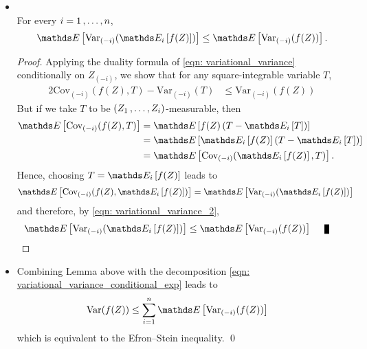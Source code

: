 \documentclass[11pt]{article}
\begin{document}
\begin{itemize}
\item \begin{lemma} \citep{boucheron2013concentration}\\
For every $i = 1 \,{,}\ldots{,}\, n$,
\begin{align*}
\E{}{\text{Var}_{(-i)}(\E{i}{f(Z)})} \le \E{}{\text{Var}_{(-i)}(f(Z))}.
\end{align*}
\end{lemma}
\begin{proof}
Applying the duality formula of \eqref{eqn: variational_variance} conditionally on $Z_{(-i)}$, we show that for any square-integrable variable $T$,
\begin{align}
2 \text{Cov}_{(-i)}(f(Z), T) - \text{Var}_{(-i)}(T) &\le \text{Var}_{(-i)}(f(Z))  \label{eqn: variational_variance_2}
\end{align} But if we take $T$ to be $(Z_1 \,{,}\ldots{,}\, Z_i)$-measurable, then
\begin{align*}
\E{}{\text{Cov}_{(-i)}(f(Z), T)} &= \E{}{f(Z)\paren{T - \E{i}{T}}}\\
&= \E{}{\E{i}{f(Z)}\paren{T - \E{i}{T}}}\\
&= \E{}{\text{Cov}_{(-i)}(\E{i}{f(Z)}, T)}.
\end{align*}
Hence, choosing $T = \E{i}{f(Z)}$ leads to
\begin{align*}
\E{}{\text{Cov}_{(-i)}(f(Z), \E{i}{f(Z)})} &= \E{}{\text{Var}_{(-i)}(\E{i}{f(Z)})}
\end{align*} and therefore, by \eqref{eqn: variational_variance_2}, 
\begin{align*}
 \E{}{\text{Var}_{(-i)}(\E{i}{f(Z)})} &\le  \E{}{\text{Var}_{(-i)}(f(Z))} \qed 
\end{align*}
\end{proof}

\item \begin{remark}
Combining Lemma above with the decomposition \eqref{eqn: variational_variance_conditional_exp} leads to
\begin{align}
\text{Var}(f(Z)) &\le  \sum_{i=1}^{n} \E{}{\text{Var}_{(-i)}(f(Z))} \label{ineqn: efron_stein_inequality_duality}
\end{align} which is equivalent to the Efron–Stein inequality. \qed
\end{remark}
\end{itemize}
\end{document}
